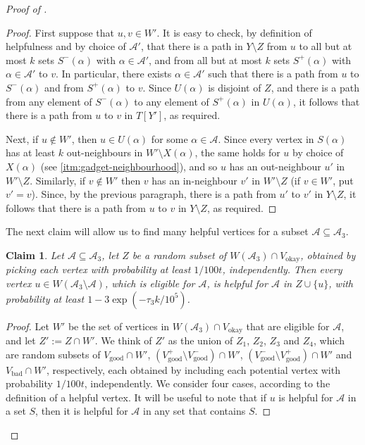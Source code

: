 \documentclass[english]{article}
\theoremstyle{plain}
\newtheorem{claim}[theorem]{Claim}
\theoremstyle{remark}
\def \Sp {S^+}
\def \Sm {S^-}
\def \Vgp {V_{\good}^+}
\def \Vgp {V_{\good}^+}
\def \Vgm {V_{\good}^-}
\def \Vo {V_{\okay}}
\def \Vg {V_{\good}}
\def \Vb {V_{\bad}}
\def \Vgm {V_{\good}^-}
\newcommand{\A}{\mathcal{A}}
\DeclareMathOperator{\bad}{bad}
\DeclareMathOperator{\good}{good}
\DeclareMathOperator{\okay}{okay}
\begin{document}
\begin{proof}[Proof of ]
\begin{proof}
			First suppose that $u, v \in W'$. It is easy to check, by definition of helpfulness and by choice of $\A'$, that there is a path in $Y \setminus Z$ from $u$ to all but at most $k$ sets $\Sm(\alpha)$ with $\alpha \in \A'$, and from all but at most $k$ sets $\Sp(\alpha)$ with $\alpha \in \A'$ to $v$. In particular, there exists $\alpha \in \A'$ such that there is a path from $u$ to $\Sm(\alpha)$ and from $\Sp(\alpha)$ to $v$. Since $U(\alpha)$ is disjoint of $Z$, and there is a path from any element of $\Sm(\alpha)$ to any element of $\Sp(\alpha)$ in $U(\alpha)$, it follows that there is a path from $u$ to $v$ in $T[Y']$, as required.

			Next, if $u \notin W'$, then $u \in U(\alpha)$ for some $\alpha \in \A$. Since every vertex in $S(\alpha)$ has at least $k$ out-neighbours in $W' \setminus X(\alpha)$, the same holds for $u$ by choice of $X(\alpha)$ (see \ref{itm:gadget-neighbourhood}), and so $u$ has an out-neighbour $u'$ in $W' \setminus Z$. Similarly, if $v \notin W'$ then $v$ has an in-neighbour $v'$ in $W' \setminus Z$ (if $v \in W'$, put $v' = v$). Since, by the previous paragraph, there is a path from $u'$ to $v'$ in $Y \setminus Z$, it follows that there is a path from $u$ to $v$ in $Y \setminus Z$, as required.
		\end{proof}

		The next claim will allow us to find many helpful vertices for a subset $\A \subseteq \A_3$. 

		\begin{claim} \label{claim:vertex-helpful}
			Let $\A \subseteq \A_3$, let $Z$ be a random subset of $W(\A_3) \cap \Vo$, obtained by picking each vertex with probability at least $1/100t$, independently. Then every vertex $u \in W(\A_3 \setminus \A)$, which is eligible for $\A$, is helpful for $\A$ in $Z \cup \{u\}$, with probability at least $1 - 3\exp(-\tau_3 k / 10^5)$. 
		\end{claim}

		\begin{proof}
			Let $W'$ be the set of vertices in $W(\A_3) \cap \Vo$ that are eligible for $\A$, and let $Z' := Z \cap W'$. We think of $Z'$ as the union of $Z_1$, $Z_2$, $Z_3$ and $Z_4$, which are random subsets of $\Vg \cap W'$, $(\Vgp \setminus \Vgm) \cap W'$, $(\Vgm \setminus \Vgp) \cap W'$ and $\Vb \cap W'$, respectively, each obtained by including each potential vertex with probability $1 / 100t$, independently. 
			We consider four cases, according to the definition of a helpful vertex. It will be useful to note that if $u$ is helpful for $\A$ in a set $S$, then it is helpful for $\A$ in any set that contains $S$. 


\end{proof}
\end{proof}
\end{document}
